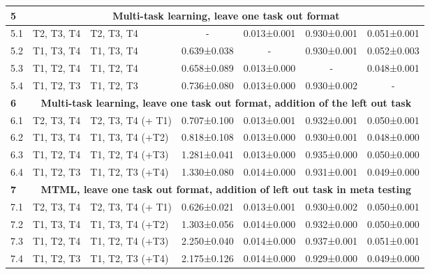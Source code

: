 \documentclass[conference]{IEEEtran}
\begin{document}
\begin{table*}[ht]
\begin{tiny}
{\begin{tabular}{lllcccc}
\textbf{5} &
  \multicolumn{6}{c}{\textbf{Multi-task learning, leave one task out format}} \\ \hline
5.1 &
  T2, T3, T4 &
  T2, T3, T4 &
   - &
  0.013±0.001 &
  0.930±0.001 &
  0.051±0.001 \\
5.2 &
  T1, T3, T4 &
  T1, T3, T4 &
  0.639±0.038 &
   - &
  0.930±0.001 &
  0.052±0.003 \\
5.3 &
  T1, T2, T4 &
  T1, T2, T4 &
  0.658±0.089 &
  0.013±0.000 &
  - &
  0.048±0.001 \\
5.4 &
  T1, T2, T3 &
  T1, T2, T3 &
  0.736±0.080 &
  0.013±0.000 &
  0.930±0.002 & -
   \\ \hline
\textbf{6} &
  \multicolumn{6}{c}{\textbf{Multi-task learning, leave one task out format, addition of the left out task}} \\ \hline
6.1 &
  T2, T3, T4 &
  T2, T3, T4 (+ T1) &
  {\color[HTML]{444444} 0.707±0.100} &
  {\color[HTML]{444444} 0.013±0.001} &
  {\color[HTML]{444444} 0.932±0.001} &
  {\color[HTML]{444444} 0.050±0.001} \\
6.2 &
  T1, T3, T4 &
  T1, T3, T4 (+T2) &
  {\color[HTML]{444444} 0.818±0.108} &
  {\color[HTML]{444444} 0.013±0.000} &
  {\color[HTML]{444444} 0.930±0.001} &
  {\color[HTML]{444444} 0.048±0.000} \\
6.3 &
  T1, T2, T4 &
  T1, T2, T4 (+T3) &
  {\color[HTML]{444444} 1.281±0.041} &
  {\color[HTML]{444444} 0.013±0.000} &
  {\color[HTML]{444444} 0.935±0.000} &
  {\color[HTML]{444444} 0.050±0.000} \\
6.4 &
  T1, T2, T3 &
  T1, T2, T3 (+T4) &
  {\color[HTML]{444444} 1.330±0.080} &
  {\color[HTML]{444444} 0.014±0.000} &
  {\color[HTML]{444444} 0.931±0.001} &
  {\color[HTML]{444444} 0.049±0.000} \\ \hline
\textbf{7} &
  \multicolumn{6}{c}{\textbf{\ac{MTML}, leave one task out format, addition of left out task in meta testing}} \\ \hline
7.1 &
  T2, T3, T4 &
  T2, T3, T4 (+ T1) &
  0.626±0.021 &
  0.013±0.001 &
  0.930±0.002 &
  0.050±0.001 \\
7.2 &
  T1, T3, T4 &
  T1, T3, T4 (+T2) &
  1.303±0.056 &
  0.014±0.000 &
  0.932±0.000 &
  0.050±0.000 \\
7.3 &
  T1, T2, T4 &
  T1, T2, T4 (+T3) &
  2.250±0.040 &
  0.014±0.000 &
  0.937±0.001 &
  0.051±0.001 \\
7.4 &
  T1, T2, T3 &
  T1, T2, T3 (+T4) &
  2.175±0.126 &
  0.014±0.000 &
  0.929±0.000 &
  0.049±0.000 \\ \hline
\end{tabular}
}
\end{tiny}
\vspace{-0.4cm}
\end{table*} 
\end{document}
